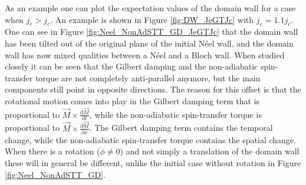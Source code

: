 \documentclass[12pt, a4paper]{article}		%
\numberwithin{equation}{section}
\begin{document}
As an example one can plot the expectation values of the domain wall for a case when $j_e>j_c$. An example is shown in Figure \ref{fig:DW_JeGTJc} with $j_e = 1.1j_c$. One can see in Figure \ref{fig:Neel_NonAdSTT_GD_JeGTJc} that the domain wall has been tilted out of the original plane of the initial N\'{e}el wall, and the domain wall has now mixed qualities between a N\'{e}el and a Bloch wall. When studied closely it can be seen that the Gilbert damping and the non-adiabatic spin-transfer torque are not completely anti-parallel anymore, but the main components still point in opposite directions. The reason for this offset is that the rotational motion comes into play in the Gilbert damping term that is proportional to $\vec{M}\times\frac{\textrm{d} \vec{M}}{\textrm{d} t}$, while the non-adiabatic spin-transfer torque is proportional to $\vec{M}\times\frac{\partial \vec{M}}{\partial x}$. The Gilbert damping term contains the temporal change, while the non-adiabatic spin-transfer torque contains the spatial change. When there is a rotation ($\dot{\phi} \neq 0$) and not simply a translation of the domain wall these will in general be different, unlike the initial case without rotation in Figure \ref{fig:Neel_NonAdSTT_GD}.
\end{document}
